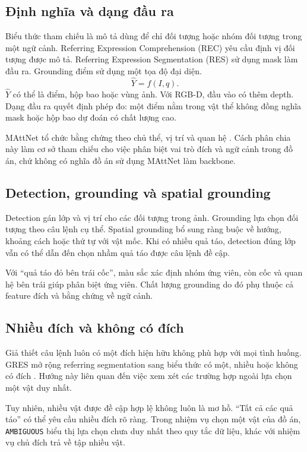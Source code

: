 \subsection{Định nghĩa và dạng đầu ra}

Biểu thức tham chiếu là mô tả dùng để chỉ đối tượng hoặc nhóm đối tượng trong một ngữ cảnh. Referring Expression Comprehension (REC) yêu cầu định vị đối tượng được mô tả. Referring Expression Segmentation (RES) sử dụng mask làm đầu ra. Grounding điểm sử dụng một tọa độ đại diện.
\begin{equation}
    \widehat{Y}=f(I,q).
    \label{eq:theory-grounding}
\end{equation}
$\widehat{Y}$ có thể là điểm, hộp bao hoặc vùng ảnh. Với RGB-D, đầu vào có thêm depth. Dạng đầu ra quyết định phép đo: một điểm nằm trong vật thể không đồng nghĩa mask hoặc hộp bao dự đoán có chất lượng cao.

MAttNet tổ chức bằng chứng theo chủ thể, vị trí và quan hệ \cite{yu2018mattnet}. Cách phân chia này làm cơ sở tham chiếu cho việc phân biệt vai trò đích và ngữ cảnh trong đồ án, chứ không có nghĩa đồ án sử dụng MAttNet làm backbone.

\subsection{Detection, grounding và spatial grounding}

Detection gán lớp và vị trí cho các đối tượng trong ảnh. Grounding lựa chọn đối tượng theo câu lệnh cụ thể. Spatial grounding bổ sung ràng buộc về hướng, khoảng cách hoặc thứ tự với vật mốc. Khi có nhiều quả táo, detection đúng lớp vẫn có thể dẫn đến chọn nhầm quả táo được câu lệnh đề cập.

Với “quả táo đỏ bên trái cốc”, màu sắc xác định nhóm ứng viên, còn cốc và quan hệ bên trái giúp phân biệt ứng viên. Chất lượng grounding do đó phụ thuộc cả feature đích và bằng chứng về ngữ cảnh.

\subsection{Nhiều đích và không có đích}

Giả thiết câu lệnh luôn có một đích hiện hữu không phù hợp với mọi tình huống. GRES mở rộng referring segmentation sang biểu thức có một, nhiều hoặc không có đích \cite{liu2023gres}. Hướng này liên quan đến việc xem xét các trường hợp ngoài lựa chọn một vật duy nhất.

Tuy nhiên, nhiều vật được đề cập hợp lệ không luôn là mơ hồ. “Tất cả các quả táo” có thể yêu cầu nhiều đích rõ ràng. Trong nhiệm vụ chọn một vật của đồ án, \texttt{AMBIGUOUS} biểu thị lựa chọn chưa duy nhất theo quy tắc dữ liệu, khác với nhiệm vụ chủ đích trả về tập nhiều vật.

